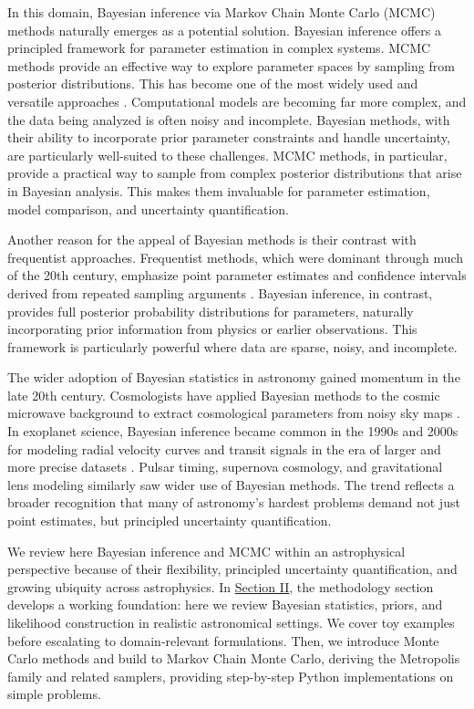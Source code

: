\documentclass[preprint,longauthor]{aastex631}
\numberwithin{equation}{section}
\begin{document}
In this domain, Bayesian inference via Markov Chain Monte Carlo (MCMC) methods naturally emerges as a potential solution. Bayesian inference offers a principled framework for parameter estimation in complex systems. MCMC methods provide an effective way to explore parameter spaces by sampling from posterior distributions. This has become one of the most widely used and versatile approaches \citep{vontoussaintBayesianInferencePhysics2011}. Computational models are becoming far more complex, and the data being analyzed is often noisy and incomplete. Bayesian methods, with their ability to incorporate prior parameter constraints and handle uncertainty, are particularly well-suited to these challenges. MCMC methods, in particular, provide a practical way to sample from complex posterior distributions that arise in Bayesian analysis. This makes them invaluable for parameter estimation, model comparison, and uncertainty quantification.

Another reason for the appeal of Bayesian methods is their contrast with frequentist approaches. Frequentist methods, which were dominant through much of the 20th century, emphasize point parameter estimates and confidence intervals derived from repeated sampling arguments \citep{trottaBayesSkyBayesian2008}. Bayesian inference, in contrast, provides full posterior probability distributions for parameters, naturally incorporating prior information from physics or earlier observations. This framework is particularly powerful where data are sparse, noisy, and incomplete.

The wider adoption of Bayesian statistics in astronomy gained momentum in the late 20th century. Cosmologists have applied Bayesian methods to the cosmic microwave background to extract cosmological parameters from noisy sky maps \citep{tegmarkKarhunenLoeveEigenvalueProblems1997}. In exoplanet science, Bayesian inference became common in the 1990s and 2000s for modeling radial velocity curves and transit signals in the era of larger and more precise datasets \citep{gregoryBayesianAnalysisExtrasolar2005}. Pulsar timing, supernova cosmology, and gravitational lens modeling similarly saw wider use of Bayesian methods. The trend reflects a broader recognition that many of astronomy’s hardest problems demand not just point estimates, but principled uncertainty quantification.

We review here Bayesian inference and MCMC within an astrophysical perspective because of their flexibility, principled uncertainty quantification, and growing ubiquity across astrophysics. In \hyperref[sec:Methodology]{Section II}, the methodology section develops a working foundation: here we review Bayesian statistics, priors, and likelihood construction in realistic astronomical settings. We cover toy examples before escalating to domain-relevant formulations. Then, we introduce Monte Carlo methods and build to Markov Chain Monte Carlo, deriving the Metropolis family and related samplers, providing step-by-step Python implementations on simple problems.
\end{document}

